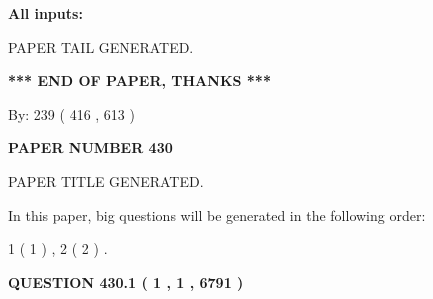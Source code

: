 \documentclass[12pt]{article}
\begin{document}
   
   
   
\noindent{}
   
   
   
   
\noindent\vspace{0.1in}\hspace{-0.08in} {\textbf{\Large{All inputs: }}}
   
   
   
   
   
   
 \vspace{0.2in}
 
   
   
\vspace{2.0in} PAPER TAIL GENERATED.
   
   
   
   
\vspace{1.0in} 
{\textbf{\large{ *** END OF PAPER, THANKS *** }}} 
   
   
\hspace{1.0in} By: 
 239 ( 416 ,  613 )
   
   
   
   
\newpage 
\setcounter{page}{ 
   430001 } 
   
   
   
   
 {\textbf{ \Large{ PAPER NUMBER  430  }}}
   
   
\vspace{0.2in}
   
   
   
   
   
   
   
   
 \vspace{0.2in}
 
 
 
 
   
   
 PAPER TITLE GENERATED.
   
   
   
\vspace{0.2in}
   
In this paper, big questions will be generated in the following order: 
   
   
   1 ( 1 )
 ,
   2 ( 2 )
 .
  
\vspace{0.2in}
  
{\textbf{\Large{QUESTION
430.1 
 ( 1 , 1 , 6791 )
}}}
  
\end{document}
